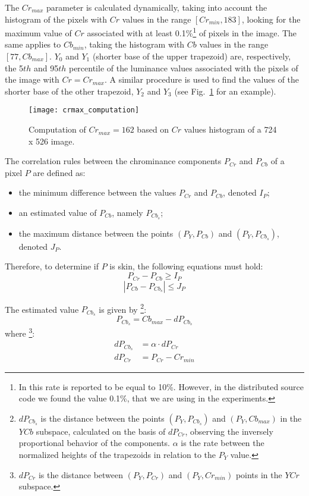 The $Cr_{max}$ parameter is calculated dynamically, taking into account the histogram of the pixels with $Cr$ values in the range $[Cr_{min}, 183]$, looking for the maximum value of $Cr$ associated with at least 0.1\%\footnote{In \citet{brancati:17} this rate is reported to be equal to 10\%. However, in the distributed source code we found the value 0.1\%, that we are using in the experiments.} of pixels in the image. The same applies to $Cb_{min}$, taking the histogram with $Cb$ values in the range $[77, Cb_{max}]$. $Y_0$ and $Y_1$ (shorter base of the upper trapezoid) are, respectively, the 5${th}$ and 95$th$ percentile of the luminance values associated with the pixels of the image with $Cr = Cr_{max}$. A similar procedure is used to find the values of the shorter base of the other trapezoid, $Y_2$ and $Y_3$ (see Fig.~\ref{fig:crmax_computation} for an example).

\begin{figure}[ht]
    \centering
    \texttt{[image: crmax\_computation]}
    \caption[Computation of $Cr_{max}$ based on $Cr$ values histogram of a 724 x 526 image]{Computation of $Cr_{max} = 162$ based on $Cr$ values histogram of a 724 x 526 image.}
    \label{fig:crmax_computation}
\end{figure}

The correlation rules between the chrominance components $P_{Cr}$ and $P_{Cb}$ of a pixel $P$ are defined as:
\begin{itemize}
    \item the minimum difference between the values $P_{Cr}$ and $P_{Cb}$, denoted $I_P$;
    \item an estimated value of $P_{Cb}$, namely $P_{Cb_s}$;
    \item the maximum distance between the points $(P_Y, P_{Cb})$ and $(P_Y, P_{Cb_s})$, denoted $J_P$.
\end{itemize}

Therefore, to determine if $P$ is skin, the following equations must hold:
\begin{equation}
    P_{Cr} - P_{Cb} \geq I_P
\label{condition_c0}
\end{equation}
\begin{equation}
   |P_{Cb} - P_{Cb_s}| \leq J_P
\label{condition_c1}
\end{equation}

The estimated value $P_{Cb_{s}}$ is given by \footnote{$dP_{Cb_{s}}$ is the distance between the points $(P_Y, P_{Cb_{s}})$ and $(P_Y, Cb_{max})$ in the $YCb$ subspace, calculated on the basis of $dP_{Cr}$, observing the inversely proportional behavior of the components. $\alpha$ is the rate between the normalized heights of the trapezoids in relation to the $P_Y$ value.}:
\begin{equation}
    P_{Cb_s} = Cb_{max} - dP_{Cb_s}
\end{equation}
where \footnote{$dP_{Cr}$ is the distance between $(P_Y, P_{Cr})$ and $(P_Y, Cr_{min})$ points in the $YCr$ subspace.}:
\begin{align}
    dP_{Cb_s} &= \alpha \cdot dP_{Cr}
    \\
    dP_{Cr} &= P_{Cr} - Cr_{min}
\end{align}

